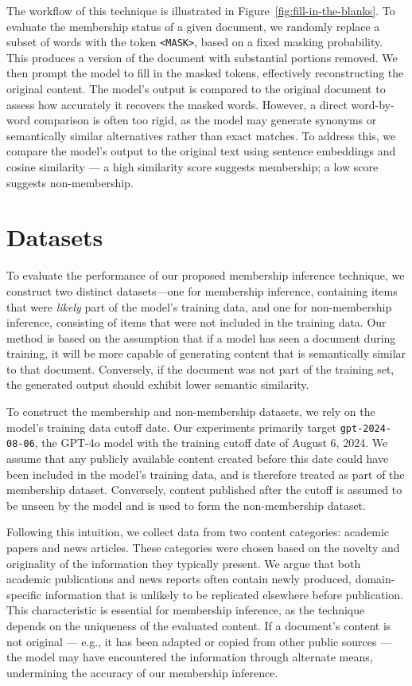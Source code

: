\documentclass[sigconf]{acmart}
\begin{document}
The workflow of this technique is illustrated in Figure~\ref{fig:fill-in-the-blanks}. To evaluate the membership status of a given document, we randomly replace a subset of words with the token \texttt{<MASK>}, based on a fixed masking probability. This produces a version of the document with substantial portions removed. We then prompt the model to fill in the masked tokens, effectively reconstructing the original content. The model’s output is compared to the original document to assess how accurately it recovers the masked words. However, a direct word-by-word comparison is often too rigid, as the model may generate synonyms or semantically similar alternatives rather than exact matches. To address this, we compare the model’s output to the original text using sentence embeddings and cosine similarity --- a high similarity score suggests membership; a low score suggests non-membership.

\section{Datasets}

To evaluate the performance of our proposed membership inference technique, we construct two distinct datasets—one for membership inference, containing items that were \textit{likely} part of the model’s training data, and one for non-membership inference, consisting of items that were not included in the training data. Our method is based on the assumption that if a model has seen a document during training, it will be more capable of generating content that is semantically similar to that document. Conversely, if the document was not part of the training set, the generated output should exhibit lower semantic similarity.

To construct the membership and non-membership datasets, we rely on the model’s training data cutoff date. Our experiments primarily target \texttt{gpt-2024-08-06}, the GPT-4o model with the training cutoff date of August 6, 2024. We assume that any publicly available content created before this date could have been included in the model’s training data, and is therefore treated as part of the membership dataset. Conversely, content published after the cutoff is assumed to be unseen by the model and is used to form the non-membership dataset.

Following this intuition, we collect data from two content categories: academic papers and news articles. These categories were chosen based on the novelty and originality of the information they typically present. We argue that both academic publications and news reports often contain newly produced, domain-specific information that is unlikely to be replicated elsewhere before publication. This characteristic is essential for membership inference, as the technique depends on the uniqueness of the evaluated content. If a document’s content is not original --- e.g., it has been adapted or copied from other public sources --- the model may have encountered the information through alternate means, undermining the accuracy of our membership inference.
\end{document}
